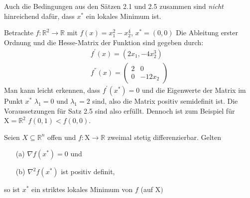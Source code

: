 \documentclass[a4paper,10pt]{scrartcl}
\begin{document}
Auch die Bedingungen aus den Sätzen 2.1 und 2.5 zusammen sind \textit{nicht} hinreichend dafür, dass $x^{*}$ ein lokales Minimum ist.

\begin{beispiel}
	Betrachte $ f: \mathbb{R}^{2} \longrightarrow \mathbb{R} $ mit $f(x) = x_{1}^{2} - x_{2}^{4}$, $x^{*} =(0,0)$ Die Ableitung erster Ordnung und die Hesse-Matrix der Funktion sind gegeben durch: 
	\begin{align*}
	f^{'}(x)=(2x_{1} , -4x_{2}^{3}) \\
	f^{''}(x)=\begin{pmatrix}
	2 & 0 \\
	0 & -12 x_{2}
	\end{pmatrix}
	\end{align*}
	Man kann leicht erkennen, dass $f^{'}(x^{*})=0$ und die Eigenwerte der Matrix im Punkt $x^{*}$ $ \lambda_{1} =0$ und $\lambda_{1} =2$ sind, also die Matrix positiv semidefinit ist. Die Voraussetzungen für Satz 2.5 sind also erfüllt. Dennoch ist zum Beispiel für $\mathrm{X}= \mathbb{R}^{2}$ $f(0,1)<f(0,0)$. 
\end{beispiel}

\begin{satz}
	Seien $ X \subseteq \mathbb{R}^n $ offen und $ f:\mathrm{X} \longrightarrow \mathbb{R} $ zweimal stetig differenzierbar. Gelten
	\begin{itemize}
		\item[(a)] $\nabla f(x^{*}) =0$ und 
		\item[(b)] $\nabla^{2} f(x^{*})$ ist positiv definit, 
	\end{itemize}
	so ist $x^{*}$ ein striktes lokales Minimum von $f$ (auf $\mathrm{X})$
\end{satz}
\end{document}
